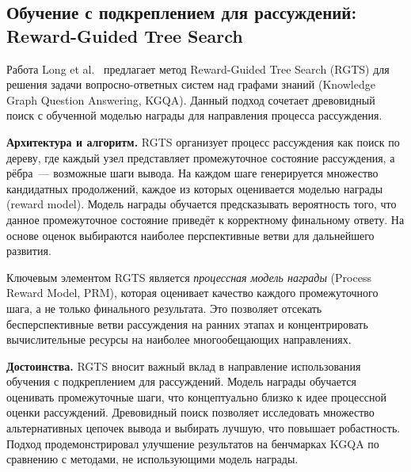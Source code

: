 \subsection{Обучение с подкреплением для рассуждений: Reward-Guided Tree Search}
\label{subsec:reward-tree-search}

Работа Long et al.~\cite{long2025rewardtreesearch} предлагает метод Reward-Guided Tree Search (RGTS) для решения задачи вопросно-ответных систем над графами знаний (Knowledge Graph Question Answering, KGQA). Данный подход сочетает древовидный поиск с обученной моделью награды для направления процесса рассуждения.

\textbf{Архитектура и алгоритм.}
RGTS организует процесс рассуждения как поиск по дереву, где каждый узел представляет промежуточное состояние рассуждения, а рёбра~--- возможные шаги вывода. На каждом шаге генерируется множество кандидатных продолжений, каждое из которых оценивается моделью награды (reward model). Модель награды обучается предсказывать вероятность того, что данное промежуточное состояние приведёт к корректному финальному ответу. На основе оценок выбираются наиболее перспективные ветви для дальнейшего развития.

Ключевым элементом RGTS является \textit{процессная модель награды} (Process Reward Model, PRM), которая оценивает качество каждого промежуточного шага, а не только финального результата. Это позволяет отсекать бесперспективные ветви рассуждения на ранних этапах и концентрировать вычислительные ресурсы на наиболее многообещающих направлениях.

\textbf{Достоинства.}
RGTS вносит важный вклад в направление использования обучения с подкреплением для рассуждений. Модель награды обучается оценивать промежуточные шаги, что концептуально близко к идее процессной оценки рассуждений. Древовидный поиск позволяет исследовать множество альтернативных цепочек вывода и выбирать лучшую, что повышает робастность. Подход продемонстрировал улучшение результатов на бенчмарках KGQA по сравнению с методами, не использующими модель награды.

